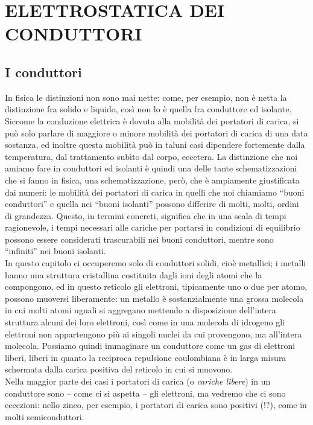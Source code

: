 \section{ELETTROSTATICA DEI CONDUTTORI}

\subsection{I conduttori}

In fisica le distinzioni non sono mai nette: come, per esempio, non \`e netta la
distinzione fra solido e liquido, cos\`i non lo \`e quella fra conduttore ed
isolante. Siccome la conduzione elettrica \`e dovuta alla mobilit\`a dei
portatori di carica, si pu\`o solo parlare di maggiore o minore mobilit\`a dei
portatori di carica di una data sostanza, ed inoltre questa mobilit\`a pu\`o in
taluni casi dipendere fortemente dalla temperatura, dal trattamento sub\`ito dal
corpo, eccetera. La distinzione che noi amiamo fare in conduttori ed isolanti
\`e quindi una delle tante schematizzazioni che si fanno in fisica, una
schematizzazione, per\`o, che \`e ampiamente giustificata dai numeri: le
mobilit\`a dei portatori di carica in quelli che noi chiamiamo ``buoni
conduttori'' e quella nei ``buoni isolanti'' possono differire di molti, molti,
ordini di grandezza. Questo, in termini concreti, significa che in una scala di
tempi ragionevole, i tempi necessari alle cariche per portarsi in condizioni di
equilibrio possono essere considerati trascurabili nei buoni conduttori, mentre
sono ``infiniti'' nei buoni isolanti.\\
In questo capitolo ci occuperemo solo di conduttori solidi, cio\`e metallici; i
metalli hanno una struttura cristallina costituita dagli ioni degli atomi che la
compongono, ed in questo reticolo gli elettroni, tipicamente uno o due per
atomo, possono muoversi liberamente: un metallo \`e sostanzialmente una grossa
molecola in cui molti atomi uguali si aggregano mettendo a disposizione
dell'intera struttura alcuni dei loro elettroni, cos\`i come in una molecola di
idrogeno gli elettroni non appartengono pi\`u ai singoli nuclei da cui
provengono, ma all'intera molecola. Possiamo quindi immaginare un conduttore
come un gas di elettroni liberi, liberi in quanto la reciproca repulsione
coulombiana \`e in larga misura schermata dalla carica positiva del reticolo in
cui si muovono.\\
Nella maggior parte dei casi i portatori di carica (o \emph{cariche libere}) in
un conduttore sono -- come ci si aspetta -- gli elettroni, ma vedremo che ci
sono eccezioni: nello zinco, per esempio, i portatori di carica sono positivi
(!?), come in molti semiconduttori.


